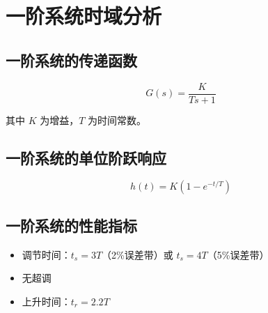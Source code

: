 \section{一阶系统时域分析}

\subsection{一阶系统的传递函数}
\[G(s) = \frac{K}{Ts + 1}\]

其中 $K$ 为增益，$T$ 为时间常数。

\subsection{一阶系统的单位阶跃响应}
\[h(t) = K(1 - e^{-t/T})\]

\subsection{一阶系统的性能指标}
\begin{itemize}
    \item 调节时间：$t_s = 3T$（2\%误差带）或 $t_s = 4T$（5\%误差带）
    \item 无超调
    \item 上升时间：$t_r = 2.2T$
\end{itemize}
